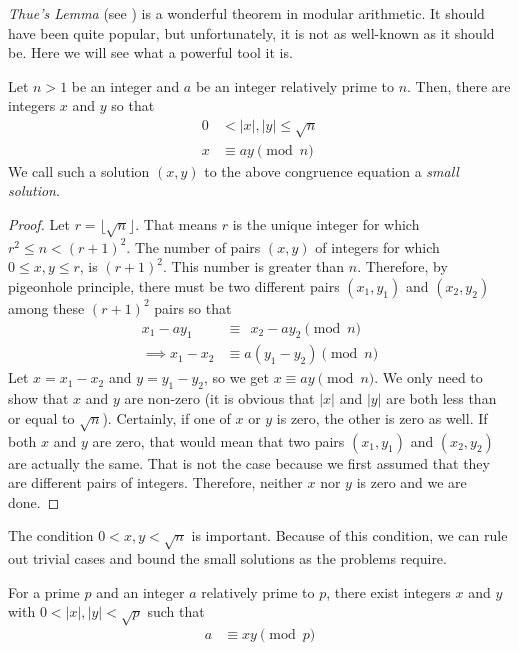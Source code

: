 \documentclass{subfile}
\begin{document}
\textit{Thue's Lemma} (see \textcite{thue_1902}) is a wonderful theorem in modular arithmetic. It should have been quite popular, but unfortunately, it is not as well-known as it should be. Here we will see what a powerful tool it is.

\begin{theorem}\label{thm:thue}
	Let $n>1$ be an integer and $a$ be an integer relatively prime to $n$. Then, there are integers $x$ and $y$ so that
	\begin{align*}
		0 &< |x|, |y| \leq \sqrt n\\
		x&\equiv ay\pmod n
	\end{align*}
	We call such a solution $(x,y)$ to the above congruence equation a \textit{small solution}.
\end{theorem}

\begin{proof}
	Let $r=\lfloor\sqrt{n}\rfloor$. That means $r$ is the unique integer for which $r^2\leq n<(r+1)^2$. The number of pairs $(x,y)$ of integers for which $0\leq x,y\leq r$, is $(r+1)^2$. This number is greater than $n$. Therefore, by pigeonhole principle, there must be two different pairs $(x_1,y_1)$ and $(x_2,y_2)$ among these $(r+1)^2$ pairs so that
	\begin{align*}
		x_1-ay_1
			& \equiv \ \ x_2-ay_2 \pmod n\\
		\implies x_1-x_2
			& \equiv a(y_1-y_2) \pmod n
	\end{align*}
	Let $x=x_1-x_2$ and $y=y_1-y_2$, so we get $x\equiv ay\pmod n$. We only need to show that $x$ and $y$ are non-zero (it is obvious that $|x|$ and $|y|$ are both less than or equal to $\sqrt n$). Certainly, if one of $x$ or $y$ is zero, the other is zero as well. If both $x$ and $y$ are zero, that would mean that two pairs $(x_1,y_1)$ and $(x_2,y_2)$ are actually the same. That is not the case because we first assumed that they are different pairs of integers. Therefore, neither $x$ nor $y$ is zero and we are done.
\end{proof}

	\begin{note}
		The condition $0<x,y<\sqrt{n}$ is important. Because of this condition, we can rule out trivial cases and bound the small solutions as the problems require.
	\end{note}

	\begin{corollary}
		For a prime $p$ and an integer $a$ relatively prime to $p$, there exist integers $x$ and $y$ with $0<|x|,|y|<\sqrt{p}$ such that
		\begin{align*}
			a & \equiv xy\pmod p
		\end{align*}
	\end{corollary}
\end{document}
